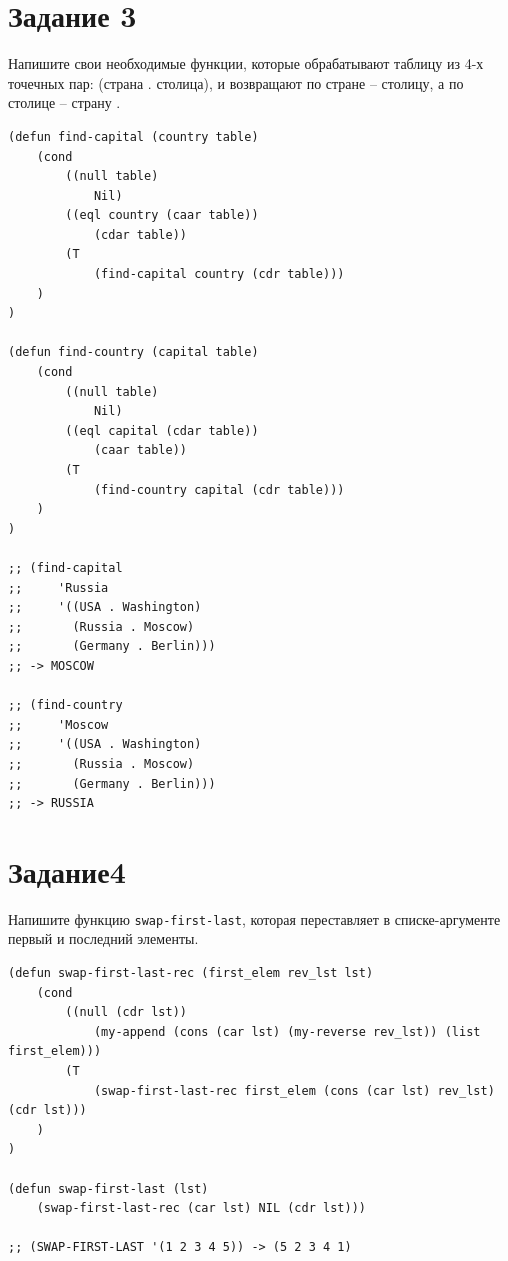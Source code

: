 \documentclass[a4paper,14pt, unknownkeysallowed]{extreport}
\begin{document}
\clearpage

\section{Задание 3}

Напишите свои необходимые функции, которые обрабатывают таблицу из 4-х точечных пар: (страна . столица), и возвращают по стране -- столицу, а по столице -- страну .

\begin{center}
\captionsetup{justification=raggedright,singlelinecheck=off}
\begin{lstlisting}[label=lst:parallel_processing,caption=Решение задания 3]
(defun find-capital (country table) 
    (cond 
        ((null table) 
            Nil)
        ((eql country (caar table)) 
            (cdar table)) 
        (T 
            (find-capital country (cdr table)))
    )
)

(defun find-country (capital table) 
    (cond 
        ((null table) 
            Nil)
        ((eql capital (cdar table)) 
            (caar table)) 
        (T 
            (find-country capital (cdr table)))
    )
)

;; (find-capital
;;     'Russia
;;     '((USA . Washington)
;;       (Russia . Moscow)
;;       (Germany . Berlin)))
;; -> MOSCOW

;; (find-country
;;     'Moscow
;;     '((USA . Washington)
;;       (Russia . Moscow)
;;       (Germany . Berlin)))
;; -> RUSSIA
\end{lstlisting}
\end{center}

\section{Задание4}

Напишите функцию \texttt{swap-first-last}, которая переставляет в списке-аргументе первый и последний элементы.

\begin{center}
\captionsetup{justification=raggedright,singlelinecheck=off}
\begin{lstlisting}[label=lst:parallel_processing,caption=Решение задания 4]
(defun swap-first-last-rec (first_elem rev_lst lst)
    (cond
        ((null (cdr lst))
            (my-append (cons (car lst) (my-reverse rev_lst)) (list first_elem)))
        (T  
            (swap-first-last-rec first_elem (cons (car lst) rev_lst) (cdr lst)))
    )
)

(defun swap-first-last (lst)
    (swap-first-last-rec (car lst) NIL (cdr lst)))

;; (SWAP-FIRST-LAST '(1 2 3 4 5)) -> (5 2 3 4 1)
\end{lstlisting}
\end{center}
\end{document}
